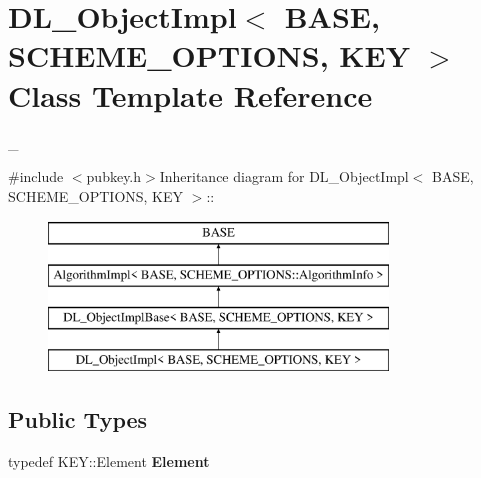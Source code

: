 \hypertarget{class_d_l___object_impl}{
\section{DL\_\-ObjectImpl$<$ BASE, SCHEME\_\-OPTIONS, KEY $>$ Class Template Reference}
\label{class_d_l___object_impl}
}


\_\-  


{\ttfamily \#include $<$pubkey.h$>$}Inheritance diagram for DL\_\-ObjectImpl$<$ BASE, SCHEME\_\-OPTIONS, KEY $>$::\begin{figure}[H]
\begin{center}
\leavevmode
\includegraphics[height=4cm]{class_d_l___object_impl}
\end{center}
\end{figure}
\subsection*{Public Types}
\begin{DoxyCompactItemize}
\item 
\hypertarget{class_d_l___object_impl_a79f28a05b245841b7295d4c119700892}{
typedef KEY::Element {\bfseries Element}}
\label{class_d_l___object_impl_a79f28a05b245841b7295d4c119700892}

\end{DoxyCompactItemize}
